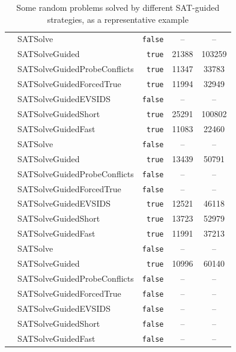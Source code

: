 \documentclass[11pt,twocolumn]{article}
\newcommand{\atom}[1]{\colorbox{Gray!30}{\ttfamily #1}}
\begin{document}
\begin{table}[t]
\begin{tabular}{@{}>{\ttfamily\bfseries}l l r S[table-format=5.0] S[table-format=6.0]@{}}
              & \atom{SATSolve}                     & \texttt{false}  & {--}  & {--} \\
              & \atom{SATSolveGuided}               & \texttt{true} & 21388 & 103259 \\
              & \atom{SATSolveGuidedProbeConflicts} & \texttt{true} & 11347 &  33783 \\
              & \atom{SATSolveGuidedForcedTrue}     & \texttt{true} & 11994 &  32949 \\
              & \atom{SATSolveGuidedEVSIDS}         & \texttt{false}  & {--}  & {--} \\
              & \atom{SATSolveGuidedShort}          & \texttt{true} & 25291 & 100802 \\
              & \atom{SATSolveGuidedFast}           & \texttt{true} & 11083 &  22460 \\
          \addlinespace

              & \atom{SATSolve}                     & \texttt{false}  & {--}  & {--} \\
              & \atom{SATSolveGuided}               & \texttt{true} & 13439 & 50791 \\
              & \atom{SATSolveGuidedProbeConflicts} & \texttt{false}  & {--}  & {--} \\
              & \atom{SATSolveGuidedForcedTrue}     & \texttt{false}  & {--}  & {--} \\
              & \atom{SATSolveGuidedEVSIDS}         & \texttt{true} & 12521 & 46118 \\
              & \atom{SATSolveGuidedShort}          & \texttt{true} & 13723 & 52979 \\
              & \atom{SATSolveGuidedFast}           & \texttt{true} & 11991 & 37213 \\
          \addlinespace

              & \atom{SATSolve}                     & \texttt{false}  & {--}  & {--} \\
              & \atom{SATSolveGuided}               & \texttt{true} & 10996 & 60140 \\
              & \atom{SATSolveGuidedProbeConflicts} & \texttt{false}  & {--}  & {--} \\
              & \atom{SATSolveGuidedForcedTrue}     & \texttt{false}  & {--}  & {--} \\
              & \atom{SATSolveGuidedEVSIDS}         & \texttt{false}  & {--}  & {--} \\
              & \atom{SATSolveGuidedShort}          & \texttt{false}  & {--}  & {--} \\
              & \atom{SATSolveGuidedFast}           & \texttt{false}  & {--}  & {--} \\
          \bottomrule
      \end{tabular}
      \caption{Some random problems solved by different SAT-guided strategies, as a representative example}
      \label{tab:sat-guided-problems}
  \end{table}
\end{document}
